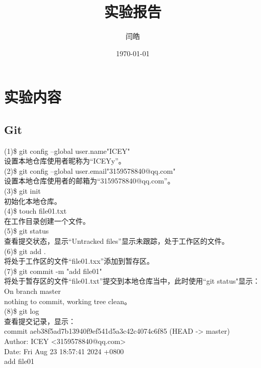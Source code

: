 \documentclass[a4paper, 12pt]{article}
\begin{document}
 \title{实验报告}
 \author{闫皓}
 \date{\today}
 \maketitle

\tableofcontents
\newpage
{}

  \section{实验内容}
    \subsection{Git}
\noindent(1){\color{blue}\$ git config --global user.name"ICEY"}\\
设置本地仓库使用者昵称为“ICEYy”。\\

\noindent(2){\color{blue}\$ git config --global user.email"3159578840@qq.com"}\\
设置本地仓库使用者的邮箱为“3159578840@qq.com”。\\

\noindent(3){\color{blue}\$ git init}\\
初始化本地仓库。\\

\noindent(4){\color{blue}\$ touch file01.txt}\\
在工作目录创建一个文件。\\

\noindent(5){\color{blue}\$ git status}\\
查看提交状态，显示“Untracked files”显示未跟踪，处于工作区的文件。\\

\noindent(6){\color{blue}\$ git add .}\\
将处于工作区的文件“file01.txx”添加到暂存区。\\

\noindent(7){\color{blue}\$ git commit -m "add file01"}\\
将处于暂存区的文件“file01.txt”提交到本地仓库当中，此时使用“git status"显示：\\
On branch master\\
nothing to commit, working tree clean。\\

\noindent(8){\color{blue}\$ git log}\\
查看提交记录，显示：\\
commit aeb38f5ad7b13940f9ef541d5a3c42c4074c6f85 (HEAD -> master)\\
Author: ICEY <3159578840@qq.com>\\
Date:   Fri Aug 23 18:57:41 2024 +0800\\
    add file01\\
\end{document}
